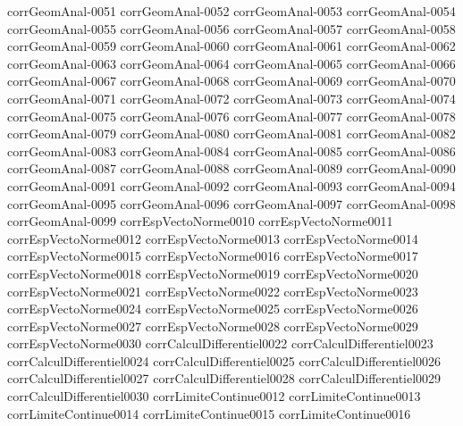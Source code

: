 {corrGeomAnal-0051}
{corrGeomAnal-0052}
{corrGeomAnal-0053}
{corrGeomAnal-0054}
{corrGeomAnal-0055}
{corrGeomAnal-0056}
{corrGeomAnal-0057}
{corrGeomAnal-0058}
{corrGeomAnal-0059}
{corrGeomAnal-0060}
{corrGeomAnal-0061}
{corrGeomAnal-0062}
{corrGeomAnal-0063}
{corrGeomAnal-0064}
{corrGeomAnal-0065}
{corrGeomAnal-0066}
{corrGeomAnal-0067}
{corrGeomAnal-0068}
{corrGeomAnal-0069}
{corrGeomAnal-0070}
{corrGeomAnal-0071}
{corrGeomAnal-0072}
{corrGeomAnal-0073}
{corrGeomAnal-0074}
{corrGeomAnal-0075}
{corrGeomAnal-0076}
{corrGeomAnal-0077}
{corrGeomAnal-0078}
{corrGeomAnal-0079}
{corrGeomAnal-0080}
{corrGeomAnal-0081}
{corrGeomAnal-0082}
{corrGeomAnal-0083}
{corrGeomAnal-0084}
{corrGeomAnal-0085}
{corrGeomAnal-0086}
{corrGeomAnal-0087}
{corrGeomAnal-0088}
{corrGeomAnal-0089}
{corrGeomAnal-0090}
{corrGeomAnal-0091}
{corrGeomAnal-0092}
{corrGeomAnal-0093}
{corrGeomAnal-0094}
{corrGeomAnal-0095}
{corrGeomAnal-0096}
{corrGeomAnal-0097}
{corrGeomAnal-0098}
{corrGeomAnal-0099}
{corrEspVectoNorme0010}
{corrEspVectoNorme0011}
{corrEspVectoNorme0012}
{corrEspVectoNorme0013}
{corrEspVectoNorme0014}
{corrEspVectoNorme0015}
{corrEspVectoNorme0016}
{corrEspVectoNorme0017}
{corrEspVectoNorme0018}
{corrEspVectoNorme0019}
{corrEspVectoNorme0020}
{corrEspVectoNorme0021}
{corrEspVectoNorme0022}
{corrEspVectoNorme0023}
{corrEspVectoNorme0024}
{corrEspVectoNorme0025}
{corrEspVectoNorme0026}
{corrEspVectoNorme0027}
{corrEspVectoNorme0028}
{corrEspVectoNorme0029}
{corrEspVectoNorme0030}
{corrCalculDifferentiel0022}
{corrCalculDifferentiel0023}
{corrCalculDifferentiel0024}
{corrCalculDifferentiel0025}
{corrCalculDifferentiel0026}
{corrCalculDifferentiel0027}
{corrCalculDifferentiel0028}
{corrCalculDifferentiel0029}
{corrCalculDifferentiel0030}
{corrLimiteContinue0012}
{corrLimiteContinue0013}
{corrLimiteContinue0014}
{corrLimiteContinue0015}
{corrLimiteContinue0016}
